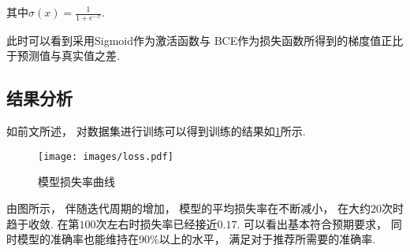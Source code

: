 其中$ \sigma(x)=\frac{1}{1+e^{-x}} $.

此时可以看到采用Sigmoid作为激活函数与
BCE作为损失函数所得到的梯度值正比于预测值与真实值之差.

\subsection{结果分析}

如前文所述，
对数据集进行训练可以得到训练的结果如\cref{fig:loss}所示.

\begin{figure}[!htbp]
  \centering
  \texttt{[image: images/loss.pdf]}
  \caption{模型损失率曲线}\label{fig:loss}
\end{figure}

由图所示，
伴随迭代周期的增加，
模型的平均损失率在不断减小，
在大约$20$次时趋于收敛.
在第$100$次左右时损失率已经接近$0.17$.
可以看出基本符合预期要求，
同时模型的准确率也能维持在90\%以上的水平，
满足对于推荐所需要的准确率.